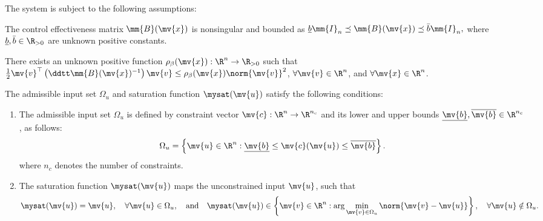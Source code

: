 The system is subject to the following assumptions:

\begin{assum} 
  \label{CONAC:assum:B:bound}
  The control effectiveness matrix $\mm{B}(\mv{x})$ is nonsingular and bounded as   
  $
    \underline{b}\mm{I}_n
    \preceq 
    \mm{B}(\mv{x})
    \preceq 
    \bar{b}\mm{I}_n
    ,
  $
  where $\underline{b},\bar{b}\in\R_{>0}$ are unknown positive constants.
\end{assum}

\begin{assum} 
  \label{CONAC:assum:B:bound:grad}
  There exists an unknown positive function $\rho_{\beta}(\mv{x}):\R^n\to\R_{>0}$ such that $\tfrac{1}{2}\mv{v}^\top\left(\ddtt\mm{B}(\mv{x})^{-1}\right)\mv{v} \le \rho_{\beta}(\mv{x})\norm{\mv{v}}^2$, $\forall \mv{v}\in\R^n$, and $\forall \mv{x}\in\R^n$. 
\end{assum}

\begin{assum} 
  \label{CONAC:assum:sat}
  The admissible input set $\Omega_u$ and saturation function $\mysat(\mv{u})$ satisfy the following conditions:
  \begin{enumerate}
    \item
    The admissible input set $\Omega_u$ is defined by constraint vector $\mv{c}:\R^n\to\R^{n_c}$ and its lower and upper bounds $\underline{\mv{b}},\overline{\mv{b}}\in\R^{n_c}$, as follows:
    \begin{equation}
      \label{CONAC:eq:adm:input:set}
      \Omega_u
      =
      \left\{
        \mv{u}\in\R^n
        :
        \underline{\mv{b}} \le \mv{c}(\mv{u}) \le \overline{\mv{b}}
      \right\}
      .
    \end{equation}
    where $n_c$ denotes the number of constraints.

    \item
    The saturation function $\mysat(\mv{u})$ maps the unconstrained input $\mv{u}$, such that 
    \begin{equation}
      \mysat(\mv{u})=\mv{u},\quad \forall \mv{u}\in\Omega_u
      ,
      \quad\text{and}\quad
      \mysat(\mv{u})
      \in
      \left\{
        \mv{v}\in\R^n
        :
        \arg\min_{\mv{v}\in\Omega_u}
        \norm{\mv{v}-\mv{u}}
      \right\}
      ,
      \quad \forall \mv{u}\notin\Omega_u
      .
    \end{equation}

  \end{enumerate}
\end{assum}


